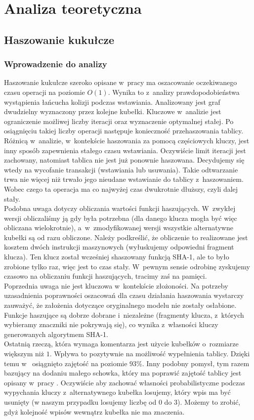 \documentclass[declaration,shortabstract,masc]{iithesis}
\begin{document}
	\chapter{Analiza teoretyczna}
		\section{Haszowanie kukułcze}
			\subsection{Wprowadzenie do analizy}
				Haszowanie kukułcze szeroko opisane w~pracy \cite{CH} ma oszacowanie oczekiwanego czasu operacji na poziomie $O(1)$. Wynika to z~analizy prawdopodobieństwa wystąpienia łańcucha kolizji podczas wstawiania. Analizowany jest graf dwudzielny wyznaczony przez kolejne kubełki. Kluczowe w~analizie jest ograniczenie możliwej liczby iteracji oraz wyznaczenie optymalnej stałej. Po osiągnięciu takiej liczby operacji następuje konieczność przehaszowania tablicy.\\
				\indent Różnicą w~analizie, w~kontekście haszowania za pomocą częściowych kluczy, jest inny sposób zapewnienia stałego czasu wstawiania. Oczywiście limit iteracji jest zachowany, natomiast tablica nie jest już ponownie haszowana. Decydujemy się wtedy na wycofanie transakcji (wstawiania lub usuwania). Takie odtwarzanie trwa nie więcej niż trwało jego nieudane wstawianie do tablicy z~haszowaniem. Wobec czego ta operacja ma co najwyżej czas dwukrotnie dłuższy, czyli dalej stały.\\
				\indent Podobna uwaga dotyczy obliczania wartości funkcji haszujących. W~zwykłej wersji obliczaliśmy ją gdy była potrzebna (dla danego klucza mogła być więc obliczana wielokrotnie), a~w~zmodyfikowanej wersji wszystkie alternatywne kubełki są od razu obliczone. Należy podkreślić, że obliczenie to realizowane jest kosztem dwóch instrukcji maszynowych (wyłuskujemy odpowiedni fragment klucza). Ten klucz został wcześniej shaszowany funkcją SHA-1, ale to było zrobione tylko raz, więc jest to czas stały. W~pewnym sensie odrobinę zyskujemy czasowo na obliczaniu funkcji haszujących, tracimy zaś na pamięci.\\
				\indent Poprzednia uwaga nie jest kluczowa w~kontekście złożoności. Na potrzeby uzasadnienia poprawności oszacowań dla czasu działania haszowania wystarczy zauważyć, że założenia dotyczące oryginalnego modelu nie zostały osłabione. Funkcje haszujące są dobrze dobrane i~niezależne (fragmenty klucza, z~których wybieramy znaczniki nie pokrywają się), co wynika z~własności kluczy generowanych algorytmem SHA-1.\\
				\indent Ostatnią rzeczą, która wymaga komentarza jest użycie kubełków o~rozmiarze większym niż $1$. Wpływa to pozytywnie na możliwość wypełnienia tablicy. Dzięki temu w~\cite{SILT} osiągnięto zajętość na poziomie $93$\%. Inny podobny pomysł, tym razem bazujący na dodaniu małego schowka, który ma poprawić zajętość tablicy jest opisany w~pracy \cite{CHwS}. Oczywiście aby zachować własności probabilistyczne podczas wypychania kluczy z~alternatywnego kubełka losujemy, który wpis ma być usunięty (w naszym przypadku losujemy liczbę od $0$ do $3$). Możemy to zrobić, gdyż kolejność wpisów wewnątrz kubełka nie ma znaczenia.
\end{document}
